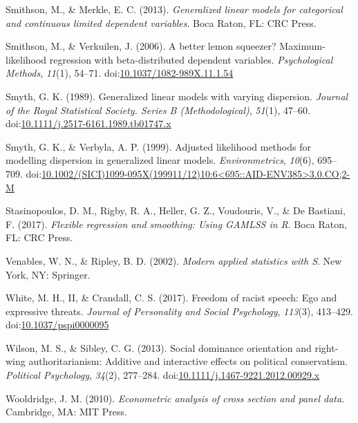 \documentclass[english,,man]{apa6}
\begin{document}
\leavevmode\hypertarget{ref-smithson2013generalized}{}%
Smithson, M., \& Merkle, E. C. (2013). \emph{Generalized linear models for categorical and continuous limited dependent variables}. Boca Raton, FL: CRC Press.

\leavevmode\hypertarget{ref-smithson2006better}{}%
Smithson, M., \& Verkuilen, J. (2006). A better lemon squeezer? Maximum-likelihood regression with beta-distributed dependent variables. \emph{Psychological Methods}, \emph{11}(1), 54--71. doi:\href{https://doi.org/10.1037/1082-989X.11.1.54}{10.1037/1082-989X.11.1.54}

\leavevmode\hypertarget{ref-smyth1989generalized}{}%
Smyth, G. K. (1989). Generalized linear models with varying dispersion. \emph{Journal of the Royal Statistical Society. Series B (Methodological)}, \emph{51}(1), 47--60. doi:\href{https://doi.org/10.1111/j.2517-6161.1989.tb01747.x}{10.1111/j.2517-6161.1989.tb01747.x}

\leavevmode\hypertarget{ref-smyth1999adjusted}{}%
Smyth, G. K., \& Verbyla, A. P. (1999). Adjusted likelihood methods for modelling dispersion in generalized linear models. \emph{Environmetrics}, \emph{10}(6), 695--709. doi:\href{https://doi.org/10.1002/(SICI)1099-095X(199911/12)10:6\%3C695::AID-ENV385\%3E3.0.CO;2-M}{10.1002/(SICI)1099-095X(199911/12)10:6\textless{}695::AID-ENV385\textgreater{}3.0.CO;2-M}

\leavevmode\hypertarget{ref-stasinopoulos2017flexible}{}%
Stasinopoulos, D. M., Rigby, R. A., Heller, G. Z., Voudouris, V., \& De Bastiani, F. (2017). \emph{Flexible regression and smoothing: Using GAMLSS in R}. Boca Raton, FL: CRC Press.

\leavevmode\hypertarget{ref-venables2002modern}{}%
Venables, W. N., \& Ripley, B. D. (2002). \emph{Modern applied statistics with S}. New York, NY: Springer.

\leavevmode\hypertarget{ref-white2017freedom}{}%
White, M. H., II, \& Crandall, C. S. (2017). Freedom of racist speech: Ego and expressive threats. \emph{Journal of Personality and Social Psychology}, \emph{113}(3), 413--429. doi:\href{https://doi.org/10.1037/pspi0000095}{10.1037/pspi0000095}

\leavevmode\hypertarget{ref-wilson2013social}{}%
Wilson, M. S., \& Sibley, C. G. (2013). Social dominance orientation and right-wing authoritarianism: Additive and interactive effects on political conservatism. \emph{Political Psychology}, \emph{34}(2), 277--284. doi:\href{https://doi.org/10.1111/j.1467-9221.2012.00929.x}{10.1111/j.1467-9221.2012.00929.x}

\leavevmode\hypertarget{ref-wooldridge2010econometric}{}%
Wooldridge, J. M. (2010). \emph{Econometric analysis of cross section and panel data}. Cambridge, MA: MIT Press.
\end{document}
